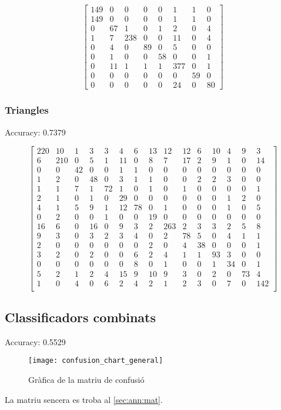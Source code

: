 \begin{equation*}
\begin{bmatrix}
    149	&	0	&	0	&	0	&	0	&	1	&	1	&	0 \\
    149	&	0	&	0	&	0	&	0	&	1	&	1	&	0 \\
    0	&	67	&	1	&	0	&	1	&	2	&	0	&	4 \\
    1	&	7	&	238	&	0	&	0	&	11	&	0	&	4 \\
    0	&	4	&	0	&	89	&	0	&	5	&	0	&	0 \\
    0	&	1	&	0	&	0	&	58	&	0	&	0	&	1 \\
    0	&	11	&	1	&	1	&	1	&	377	&	0	&	1 \\
    0	&	0	&	0	&	0	&	0	&	0	&	59	&	0 \\
    0	&	0	&	0	&	0	&	0	&	24	&	0	&	80
\end{bmatrix}
\end{equation*}

\subsubsection{Triangles}

Accuracy: 0.7379

\begin{equation*}
\begin{bmatrix}
220	&	10	&	1	&	3	&	3	&	4	&	6	&	13	&	12	&	12	&	6	&	10	&	4	&	9	&	3 \\
6	&	210	&	0	&	5	&	1	&	11	&	0	&	8	&	7	&	17	&	2	&	9	&	1	&	0	&	14 \\
0	&	0	&	42	&	0	&	0	&	1	&	1	&	0	&	0	&	0	&	0	&	0	&	0	&	0	&	0 \\
1	&	2	&	0	&	48	&	0	&	3	&	1	&	1	&	0	&	0	&	2	&	2	&	3	&	0	&	0 \\
1	&	1	&	7	&	1	&	72	&	1	&	0	&	1	&	0	&	1	&	0	&	0	&	0	&	0	&	1 \\
2	&	1	&	0	&	1	&	0	&	29	&	0	&	0	&	0	&	0	&	0	&	0	&	1	&	2	&	0 \\
4	&	1	&	5	&	9	&	1	&	12	&	78	&	0	&	1	&	0	&	0	&	0	&	1	&	0	&	5 \\
0	&	2	&	0	&	0	&	1	&	0	&	0	&	19	&	0	&	0	&	0	&	0	&	0	&	0	&	0 \\
16	&	6	&	0	&	16	&	0	&	9	&	3	&	2	&	263	&	2	&	3	&	3	&	2	&	5	&	8 \\
9	&	3	&	0	&	3	&	2	&	3	&	4	&	0	&	2	&	78	&	5	&	0	&	4	&	1	&	1 \\
2	&	0	&	0	&	0	&	0	&	0	&	0	&	2	&	0	&	4	&	38	&	0	&	0	&	0	&	1 \\
3	&	2	&	0	&	2	&	0	&	0	&	6	&	2	&	4	&	1	&	1	&	93	&	3	&	0	&	0 \\
0	&	0	&	0	&	0	&	0	&	0	&	8	&	0	&	1	&	0	&	0	&	1	&	34	&	0	&	1 \\
5	&	2	&	1	&	2	&	4	&	15	&	9	&	10	&	9	&	3	& 0	&	2	&	0	&	73	&	4 \\
1	&	0	&	4	&	0	&	6	&	2	&	4	&	2	&	1	&	2	& 3	&	0	&	7	&	0	&	142 \\
\end{bmatrix}
\end{equation*}

\subsection{Classificadors combinats}

Accuracy: 0.5529

\begin{figure}[H]
\centering
\texttt{[image: confusion\_chart\_general]}
\caption{Gràfica de la matriu de confusió}%
\label{fig:conf_chart}
\end{figure}

La matriu sencera es troba al \cref{sec:ann:mat}.
